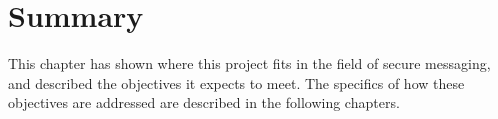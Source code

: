\documentclass[a4paper, 12pt]{report}
\begin{document}
%
%
%        
%        
%        

\section{Summary}
This chapter has shown where this project fits in the field of secure messaging, and described the objectives it expects to meet. The specifics of how these objectives are addressed are described in the following chapters.
\end{document}
